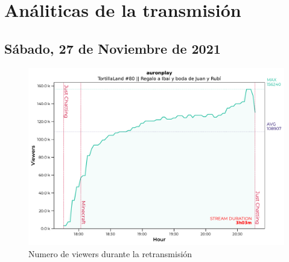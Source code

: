 \documentclass[a4paper,10pt,twoside]{report}
\begin{document}
\chapter*{Análiticas de la transmisión}
\thispagestyle{fancy}
\section*{Sábado, 27 de Noviembre de 2021}
\begin{figure}[H]
   \centering
   \includegraphics[width=1.000000\textwidth]{data/evangelion0_2021_11_27.pdf}
   \caption*{Numero de viewers durante la retransmisión}
   \end{figure}
\end{document}
